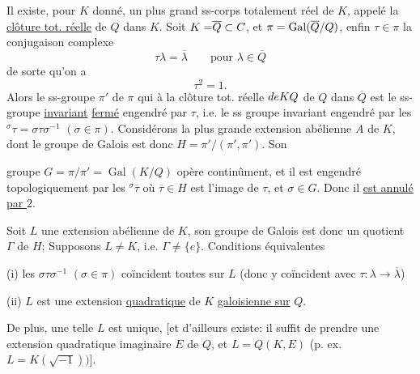 Il existe, pour $K$ donné, un plus grand ss-corps totalement réel de $K$, appelé la \uline{clôture tot. réelle} de $Q$ dans $K$. Soit ${K=}\overline Q\subset C$, et $\pi=\operatorname{Gal}({\overline Q}/Q)$, enfin $\tau\in\pi$ la conjugaison complexe
\[
\tau\lambda=\overline\lambda\qquad\text{pour }\lambda\in\overline Q
\]
de sorte qu'on a
\[
\tau^2=1.
\]
Alors le ss-groupe $\pi'$ de $\pi$ qui   à la clôture tot. réelle ${{de}}K{{Q}}$ de $Q$ dans $\overline Q$ est  le ss-groupe \uline{invariant} \uline{fermé} engendré par $\tau$, i.e. le ss groupe invariant engendré par les ${}^{\sigma}\tau=\sigma\tau\sigma^{-1}$ $(\sigma\in\pi)$.
Considérons la plus grande extension abélienne $A$ de $K$, dont le groupe de Galois est donc $H=\pi'/(\pi',\pi')$.  Son

 groupe $G=\pi/\pi'=\operatorname{Gal}(K/Q)$ opère continûment, et il est engendré topologiquement par les ${}^{\sigma}\overline\tau$ où $\overline\tau\in H$ est l'image de $\tau$, et $\sigma\in G$. Donc il \uline{est annulé par $2$}.

Soit $L$ une extension abélienne de $K$,  son groupe de Galois est donc un quotient $\Gamma$ de $H$;  Supposons $L\ne K$, i.e. $\Gamma\ne\{e\}$. Conditions équivalentes

(i) les $\sigma\tau\sigma^{-1}$ $(\sigma\in\pi)$ coïncident toutes sur $L$ (donc y coïncident avec $\tau:\lambda\to\overline\lambda$)

(ii) $L$ est une extension \uline{quadratique} de $K$ \uline{galoisienne sur} $Q$.


De plus, une telle $L$  est unique, [et d'ailleurs existe: il suffit de prendre une extension quadratique imaginaire $E$ de $Q$,  et $L=Q(K,E)$ (p. ex. $L=K(\sqrt{-1}))$].

